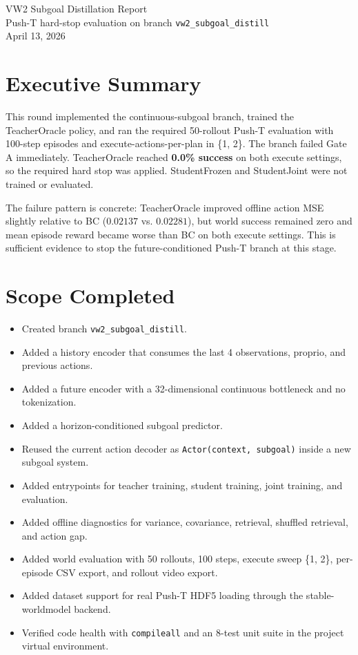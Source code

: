 \documentclass[11pt]{article}
\begin{document}
\setlength{\emergencystretch}{4em}
\sloppy

\begin{center}
{\LARGE VW2 Subgoal Distillation Report}\\[0.5em]
{\large Push-T hard-stop evaluation on branch \texttt{vw2\_subgoal\_distill}}\\[0.75em]
April 13, 2026
\end{center}

\section*{Executive Summary}
This round implemented the continuous-subgoal branch, trained the TeacherOracle policy, and ran the required 50-rollout Push-T evaluation with 100-step episodes and execute-actions-per-plan in \{1, 2\}. The branch failed Gate A immediately. TeacherOracle reached \textbf{0.0\% success} on both execute settings, so the required hard stop was applied. StudentFrozen and StudentJoint were not trained or evaluated.

The failure pattern is concrete: TeacherOracle improved offline action MSE slightly relative to BC (\(0.02137\) vs. \(0.02281\)), but world success remained zero and mean episode reward became worse than BC on both execute settings. This is sufficient evidence to stop the future-conditioned Push-T branch at this stage.

\section*{Scope Completed}
\begin{itemize}
\item Created branch \texttt{vw2\_subgoal\_distill}.
\item Added a history encoder that consumes the last 4 observations, proprio, and previous actions.
\item Added a future encoder with a 32-dimensional continuous bottleneck and no tokenization.
\item Added a horizon-conditioned subgoal predictor.
\item Reused the current action decoder as \texttt{Actor(context, subgoal)} inside a new subgoal system.
\item Added entrypoints for teacher training, student training, joint training, and evaluation.
\item Added offline diagnostics for variance, covariance, retrieval, shuffled retrieval, and action gap.
\item Added world evaluation with 50 rollouts, 100 steps, execute sweep \{1, 2\}, per-episode CSV export, and rollout video export.
\item Added dataset support for real Push-T HDF5 loading through the stable-worldmodel backend.
\item Verified code health with \texttt{compileall} and an 8-test unit suite in the project virtual environment.
\end{itemize}
\end{document}
